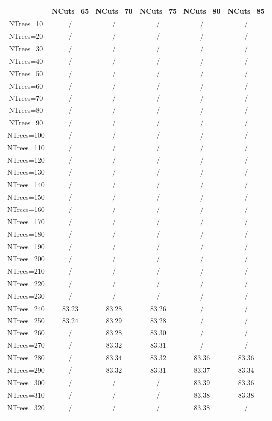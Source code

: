 \centering
\begin{tabular}{cccccc} \toprule\toprule
 & NCuts=65 & NCuts=70 & NCuts=75 & NCuts=80 & NCuts=85\\\midrule
NTrees=10 &  / &  / &  / &  / &  /\\
NTrees=20 &  / &  / &  / &  / &  /\\
NTrees=30 &  / &  / &  / &  / &  /\\
NTrees=40 &  / &  / &  / &  / &  /\\
NTrees=50 &  / &  / &  / &  / &  /\\
NTrees=60 &  / &  / &  / &  / &  /\\
NTrees=70 &  / &  / &  / &  / &  /\\
NTrees=80 &  / &  / &  / &  / &  /\\
NTrees=90 &  / &  / &  / &  / &  /\\
NTrees=100 &  / &  / &  / &  / &  /\\
NTrees=110 &  / &  / &  / &  / &  /\\
NTrees=120 &  / &  / &  / &  / &  /\\
NTrees=130 &  / &  / &  / &  / &  /\\
NTrees=140 &  / &  / &  / &  / &  /\\
NTrees=150 &  / &  / &  / &  / &  /\\
NTrees=160 &  / &  / &  / &  / &  /\\
NTrees=170 &  / &  / &  / &  / &  /\\
NTrees=180 &  / &  / &  / &  / &  /\\
NTrees=190 &  / &  / &  / &  / &  /\\
NTrees=200 &  / &  / &  / &  / &  /\\
NTrees=210 &  / &  / &  / &  / &  /\\
NTrees=220 &  / &  / &  / &  / &  /\\
NTrees=230 &  / &  / &  / &  / &  /\\
NTrees=240 & $83.23$ & $83.28$ & $83.26$ &  / &  /\\
NTrees=250 & $83.24$ & $83.29$ & $83.28$ &  / &  /\\
NTrees=260 &  / & $83.28$ & $83.30$ &  / &  /\\
NTrees=270 &  / & $83.32$ & $83.31$ &  / &  /\\
NTrees=280 &  / & $83.34$ & $83.32$ & $83.36$ & $83.36$\\
NTrees=290 &  / & $83.32$ & $83.31$ & $83.37$ & $83.34$\\
NTrees=300 &  / &  / &  / & $83.39$ & $83.36$\\
NTrees=310 &  / &  / &  / & $83.38$ & $83.38$\\
NTrees=320 &  / &  / &  / & $83.38$ &  /\\
\bottomrule\bottomrule\\
\end{tabular}
